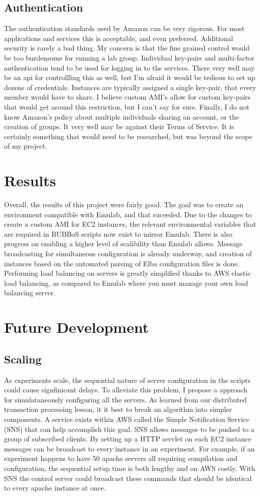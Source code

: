 \documentclass{article}
\begin{document}
\subsection{Authentication}
The authentication standards used by Amazon can be very rigorous. For most applications and services this is acceptable, and even preferred. Additional security is rarely a bad thing. My concern is that the fine grained control would be too burdensome for running a lab group. Individual key-pairs and multi-factor authentication tend to be used for logging in to the services. There very well may be an api for controllling this as well, but I'm afraid it would be tedious to set up dozens of credentials. 
Instances are typically assigned a single key-pair, that every member would have to share. I believe custom AMI's allow for custom key-pairs that would get around this restriction, but I can't say for sure.
Finally, I do not know Amazon's policy about multiple individuals sharing an account, or the creation of groups. It very well may be against their Terms of Service. It is certainly something that would need to be researched, but was beyond the scope of my project.
\section{Results}
Overall, the results of this project were fairly good. The goal was to create an environment compatible with Emulab, and that suceeded. Due to the changes to create a custom AMI for EC2 instances, the relevant environmental variables that are required in RUBBoS scripts now exist to mirror Emulab.
There is also progress on enabling a higher level of scalibility than Emulab allows. Message broadcasting for simultaneous configuration is already underway, and creation of instances based on the automated parsing of Elba configuration files is done. Performing load balancing on servers is greatly simplified thanks to AWS elastic load balancing, as compared to Emulab where you must manage your own load balancing server.
\section{Future Development}
\subsection{Scaling}
As experiments scale, the sequential nature of server configuration in the scripts could cause signfinicant delays. To alleviate this problem, I propose a approach for simulataneously configuring all the servers. As learned from our distributed transaction processing lesson, it it best to break an algorithm into simpler components.
A service exists within AWS called the Simple Notification Service (SNS) that can help accomplish this goal. SNS allows messages to be pushed to a group of subscribed clients. By setting up a HTTP servlet on each EC2 instance messages can be broadcast to every instance in an experiment. For example, if an experiment happens to have 50 apache servers all requiring compilation and configuration, the sequential setup time is both lengthy and on AWS costly. With SNS the control server could broadcast these commands that should be identical to every apache instance at once.
\end{document}
